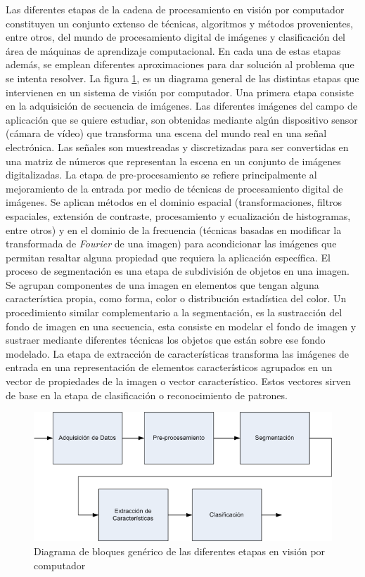 \indent Las diferentes etapas de la cadena de procesamiento en visión por computador constituyen un conjunto extenso de técnicas, algoritmos y métodos provenientes, entre otros, del mundo de procesamiento digital de imágenes y clasificación del área de máquinas de aprendizaje computacional. En cada una de estas etapas además, se emplean diferentes aproximaciones para dar solución al problema que se intenta resolver. La figura \ref{fig:etapas_vision_computador}, es un diagrama general de las distintas etapas que intervienen en un sistema de visión por computador. Una primera etapa consiste en la adquisición de secuencia de imágenes. Las diferentes imágenes del campo de aplicación que se quiere estudiar, son obtenidas mediante algún dispositivo sensor (cámara de vídeo) que transforma una escena del mundo real en una señal electrónica. Las señales son muestreadas y discretizadas para ser convertidas en una matriz de números que representan la escena en un conjunto de imágenes digitalizadas. La etapa de pre-procesamiento se refiere principalmente al mejoramiento de la entrada por medio de técnicas de procesamiento digital de imágenes. Se aplican métodos en el dominio espacial (transformaciones, filtros espaciales, extensión de contraste, procesamiento y ecualización de histogramas, entre otros) y en el dominio de la frecuencia (técnicas basadas en modificar la transformada de \textit{Fourier} de una imagen) para acondicionar las imágenes que permitan resaltar alguna propiedad que requiera la aplicación específica. El proceso de segmentación es una etapa de subdivisión de objetos en una imagen. Se agrupan componentes de una imagen en elementos que tengan alguna característica propia, como forma, color o distribución estadística del color. Un procedimiento similar complementario a la segmentación, es la sustracción del fondo de imagen en una secuencia, esta consiste en modelar el fondo de imagen y sustraer mediante diferentes técnicas los objetos que están sobre ese fondo modelado. La etapa de extracción de características transforma las imágenes de entrada en una representación de elementos característicos agrupados en un vector de propiedades de la imagen o vector característico. Estos vectores sirven de base en la etapa de clasificación o reconocimiento de patrones. 



\begin{figure}[h!]
  \centering
      \includegraphics[scale=0.5]{img/generic_block_diagram_computer_vision}
  \caption[Diagrama de bloques etapas visión por computador]{Diagrama de bloques genérico de las diferentes etapas en visión por computador}
\label{fig:etapas_vision_computador}
\end{figure}

